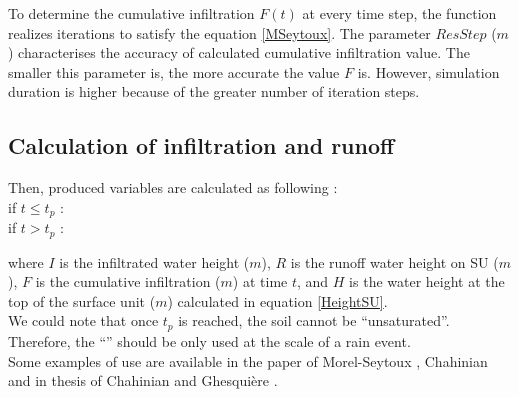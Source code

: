 To determine the cumulative infiltration $F(t)$ at every time step, the function realizes iterations to satisfy the equation \ref{MSeytoux}. The parameter $ResStep$ ($m$) characterises the accuracy of calculated cumulative infiltration value. The smaller this parameter is, the more accurate the value $F$ is. However, simulation duration is higher because of the greater number of iteration steps.


\subsection{Calculation of infiltration and runoff}
Then, produced variables are calculated as following :\\

\hspace{-0.53cm} if $t \le t_p$ : \ \ \ \\
\vspace{-0.5mm}
if $t > t_p$ : \ \ \ 

where $I$ is the infiltrated water height ($m$), $R$ is the runoff water height on SU ($m$), $F$ is the cumulative infiltration ($m$) at time $t$, and $H$ is the water height at the top of the surface unit ($m$) calculated in equation \ref{HeightSU}.\\

We could note that once $t_p$ is reached, the soil cannot be ``unsaturated''. Therefore, the ``\englishname'' should be only used at the scale of a rain event.\\

Some examples of use are available in the paper of Morel-Seytoux \cite{MorelS1984}, Chahinian \cite{Chahinian2004b} and in thesis of Chahinian \cite{Chahinian2004} and Ghesquière \cite{Ghesquiere2008}.
